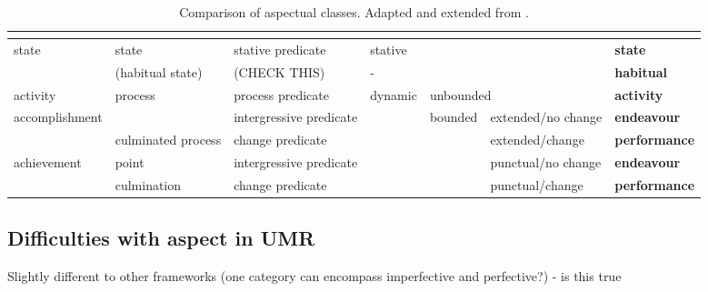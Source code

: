 \begin{table}[]
    \begin{adjustbox}{width=\textwidth}
    \begin{tabular}{|l|l|l|l|l|l|l|}
    \hline
    \citet*{vendler57} &  \citet*{moens-steedman-1988-temporal}& \citet*{egg2005flexible} & \multicolumn{3}{l}{\citet*{annotAndAutoClassOfAspectCat}}  \vline & \citet{umr} \\ \hline \hline
\multirow{2}{*}{state}         & state                      & stative predicate     & \multicolumn{3}{l}{stative} \vline & \textbf{state} \\ \cline{2-7}
                               & (habitual state)           & (CHECK THIS)          & \multicolumn{3}{l}{-} \vline & \textbf{habitual} \\ \hline
activity                       & \multirow{2}{*}{process}   & process predicate     & \multirow{5}{*}{dynamic} & \multicolumn{2}{l}{unbounded} \vline & \textbf{activity} \\ \cline{1-1}\cline{3-3}\cline{5-7}
\multirow{2}{*}{accomplishment}&                            & intergressive predicate&      & \multirow{4}{*}{bounded} &  extended/no change & \textbf{endeavour} \\ \cline{2-3}\cline{6-7}
                               & culminated process         & change predicate      &       &  & extended/change & \textbf{performance}\\ \cline{1-3}\cline{6-7}
\multirow{2}{*}{achievement}   & point                      & intergressive predicate&      &  & punctual/no change & \textbf{endeavour} \\ \cline{2-3} \cline{6-7}
                               & culmination                & change predicate      &       &  & punctual/change & \textbf{performance} \\ \hline

    \end{tabular}
    \end{adjustbox}
    \caption{Comparison of aspectual classes. Adapted and extended from \citet*{annotAndAutoClassOfAspectCat}.}
    \label{table:aspect_classes_comparison}
\end{table}

\subsection*{Difficulties with aspect in UMR}
Slightly different to other frameworks (one category can encompass imperfective and perfective?) - is this true

